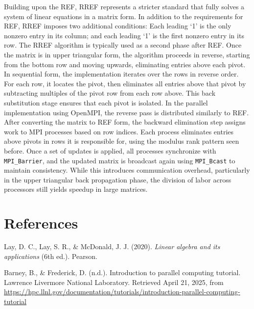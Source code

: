 \documentclass[12pt]{article}
\begin{document}
Building upon the REF, RREF represents a stricter standard that fully solves a system of linear equations in a matrix form. In addition to the requirements for REF, RREF imposes two additional conditions: Each leading ‘1’ is the only nonzero entry in its column; and each leading ‘1’ is the first nonzero entry in its row. The RREF algorithm is typically used as a second phase after REF. Once the matrix is in upper triangular form, the algorithm proceeds in reverse, starting from the bottom row and moving upwards, eliminating entries above each pivot. In sequential form, the implementation iterates over the rows in reverse order. For each row, it locates the pivot, then eliminates all entries above that pivot by subtracting multiples of the pivot row from each row above. This back substitution stage ensures that each pivot is isolated. In the parallel implementation using OpenMPI, the reverse pass is distributed similarly to REF. After converting the matrix to REF form, the backward elimination step assigns work to MPI processes based on row indices. Each process eliminates entries above pivots in rows it is responsible for, using the modulus rank pattern seen before. Once a set of updates is applied, all processes synchronize with \texttt{MPI\_Barrier}, and the updated matrix is broadcast again using \texttt{MPI\_Bcast} to maintain consistency. While this introduces communication overhead, particularly in the upper triangular back propagation phase, the division of labor across processors still yields speedup in large matrices.

\newpage
\section*{References}
Lay, D. C., Lay, S. R., \& McDonald, J. J. (2020). \textit{Linear algebra and its applications} (6th ed.). Pearson.

Barney, B., \& Frederick, D. (n.d.). Introduction to parallel computing tutorial. Lawrence Livermore National Laboratory. Retrieved April 21, 2025, from \url{https://hpc.llnl.gov/documentation/tutorials/introduction-parallel-computing-tutorial}
\end{document}
